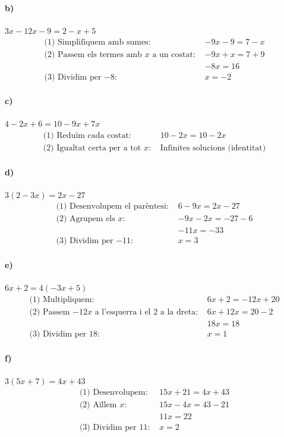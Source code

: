 \documentclass[11pt,a4paper]{article}
\begin{document}
\paragraph{b)} $3x - 12x - 9 = 2 - x + 5$
\[
\begin{aligned}
\text{(1) Simplifiquem amb sumes: } & -9x - 9 = 7 - x \\
\text{(2) Passem els termes amb $x$ a un costat: } & -9x + x = 7 + 9 \\
& -8x = 16 \\
\text{(3) Dividim per $-8$: } & \boxed{x = -2}
\end{aligned}
\]

\paragraph{c)} $4 - 2x + 6 = 10 - 9x + 7x$
\[
\begin{aligned}
\text{(1) Reduïm cada costat: } & 10 - 2x = 10 - 2x \\
\text{(2) Igualtat certa per a tot $x$: } & \boxed{\text{Infinites solucions (identitat)}}
\end{aligned}
\]

\paragraph{d)} $3(2 - 3x) = 2x - 27$
\[
\begin{aligned}
\text{(1) Desenvolupem el parèntesi: } & 6 - 9x = 2x - 27 \\
\text{(2) Agrupem els $x$: } & -9x - 2x = -27 - 6 \\
& -11x = -33 \\
\text{(3) Dividim per $-11$: } & \boxed{x = 3}
\end{aligned}
\]

\paragraph{e)} $6x + 2 = 4(-3x + 5)$
\[
\begin{aligned}
\text{(1) Multipliquem: } & 6x + 2 = -12x + 20 \\
\text{(2) Passem $-12x$ a l'esquerra i el 2 a la dreta: } & 6x + 12x = 20 - 2 \\
& 18x = 18 \\
\text{(3) Dividim per 18: } & \boxed{x = 1}
\end{aligned}
\]

\paragraph{f)} $3(5x + 7) = 4x + 43$
\[
\begin{aligned}
\text{(1) Desenvolupem: } & 15x + 21 = 4x + 43 \\
\text{(2) Aïllem $x$: } & 15x - 4x = 43 - 21 \\
& 11x = 22 \\
\text{(3) Dividim per 11: } & \boxed{x = 2}
\end{aligned}
\]
\end{document}
